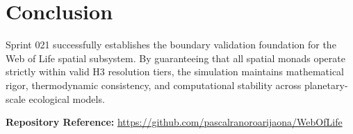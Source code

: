 \documentclass[11pt, a4paper]{article}
\begin{document}
\section{Conclusion}
Sprint 021 successfully establishes the boundary validation foundation for the Web of Life spatial subsystem. By guaranteeing that all spatial monads operate strictly within valid H3 resolution tiers, the simulation maintains mathematical rigor, thermodynamic consistency, and computational stability across planetary-scale ecological models.

\vspace{1em}
\noindent\textbf{Repository Reference:} \url{https://github.com/pascalranoroarijaona/WebOfLife}
\end{document}
